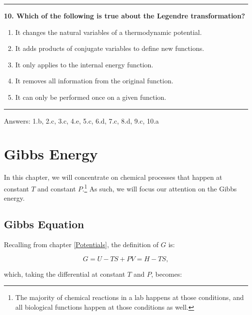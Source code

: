 \documentclass[
  9pt,
]{extbook}
\providecommand{\tightlist}{%
  \setlength{\itemsep}{0pt}\setlength{\parskip}{0pt}}
\theoremstyle{definition}
\theoremstyle{definition}
\theoremstyle{definition}
\theoremstyle{definition}
\theoremstyle{remark}
\begin{document}
\begin{center}\rule{0.5\linewidth}{0.5pt}\end{center}

\textbf{10. Which of the following is true about the Legendre transformation?}

\begin{enumerate}
\def\labelenumi{\alph{enumi}.}
\tightlist
\item
  It changes the natural variables of a thermodynamic potential.
\item
  It adds products of conjugate variables to define new functions.
\item
  It only applies to the internal energy function.
\item
  It removes all information from the original function.
\item
  It can only be performed once on a given function.
\end{enumerate}

\begin{center}\rule{0.5\linewidth}{0.5pt}\end{center}

Answers: 1.b, 2.c, 3.c, 4.e, 5.c, 6.d, 7.c, 8.d, 9.c, 10.a

\renewcommand*{\standardstate}{{-\kern-6pt{\ominus}\kern-6pt-}}

\chapter{Gibbs Energy}\label{GibbsFree}

In this chapter, we will concentrate on chemical processes that happen at constant \(T\) and constant \(P\).\footnote{The majority of chemical reactions in a lab happens at those conditions, and all biological functions happen at those conditions as well.} As such, we will focus our attention on the Gibbs energy.

\section{Gibbs Equation}\label{gibbseqsec}

Recalling from chapter \ref{Potentials}, the definition of \(G\) is:

\begin{equation}
G = U -TS +PV = H-TS,
\label{eq:dgdeftot}
\end{equation}

which, taking the differential at constant \(T\) and \(P\), becomes:
\end{document}
